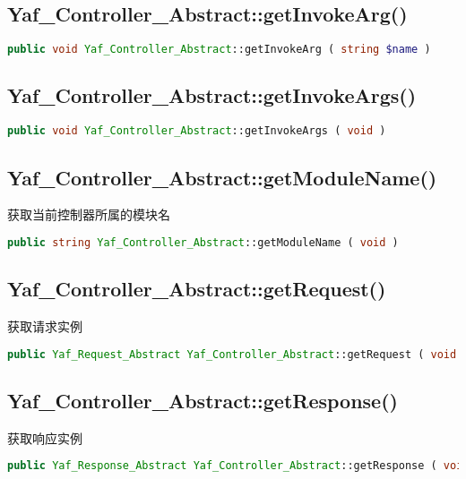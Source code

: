 \subsection{Yaf\_Controller\_Abstract::getInvokeArg()}


\begin{lstlisting}[language=PHP]
public void Yaf_Controller_Abstract::getInvokeArg ( string $name )
\end{lstlisting}




\subsection{Yaf\_Controller\_Abstract::getInvokeArgs()}


\begin{lstlisting}[language=PHP]
public void Yaf_Controller_Abstract::getInvokeArgs ( void )
\end{lstlisting}

\subsection{Yaf\_Controller\_Abstract::getModuleName()}

获取当前控制器所属的模块名




\begin{lstlisting}[language=PHP]
public string Yaf_Controller_Abstract::getModuleName ( void )
\end{lstlisting}


\subsection{Yaf\_Controller\_Abstract::getRequest()}

获取请求实例

\begin{lstlisting}[language=PHP]
public Yaf_Request_Abstract Yaf_Controller_Abstract::getRequest ( void )
\end{lstlisting}

\subsection{Yaf\_Controller\_Abstract::getResponse()}

获取响应实例

\begin{lstlisting}[language=PHP]
public Yaf_Response_Abstract Yaf_Controller_Abstract::getResponse ( void )
\end{lstlisting}

